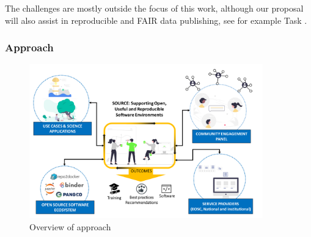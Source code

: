 The  challenges are mostly outside the focus of this work,
although our proposal will also assist in reproducible and FAIR data
publishing, see for example Task .





\subsubsection{Approach}\label{sec:methodology}

\begin{figure}[htb]
  \centerline{
    \includegraphics[width=0.90\textwidth]{images/approach.png}
    }
  \caption{Overview of \TheProject approach} \label{fig:overview-approach}
\end{figure}

